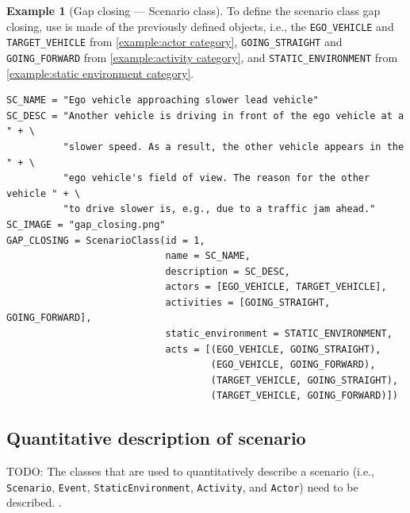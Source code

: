 \documentclass[10pt,final,a4paper,oneside,onecolumn]{article}
\theoremstyle{plain}\newtheorem{definition}{Definition}[section]    %
\theoremstyle{definition}\newtheorem{example}{Example}[section]     %
\theoremstyle{remark}\newtheorem{remarkenv}{Remark}[section]        %
\begin{document}
\begin{example}[Gap closing --- Scenario class]
	To define the scenario class gap closing, use is made of the previously defined objects, i.e., the \texttt{EGO\_VEHICLE} and \texttt{TARGET\_VEHICLE} from \cref{example:actor category}, \texttt{GOING\_STRAIGHT} and \texttt{GOING\_FORWARD} from \cref{example:activity category}, and \texttt{STATIC\_ENVIRONMENT} from \cref{example:static environment category}.
	
	\begin{lstlisting}[caption=Code for instantiating an object of \texttt{ScenarioClass}.]
SC_NAME = "Ego vehicle approaching slower lead vehicle"
SC_DESC = "Another vehicle is driving in front of the ego vehicle at a " + \
          "slower speed. As a result, the other vehicle appears in the " + \
          "ego vehicle's field of view. The reason for the other vehicle " + \
          "to drive slower is, e.g., due to a traffic jam ahead."
SC_IMAGE = "gap_closing.png"
GAP_CLOSING = ScenarioClass(id = 1,
                            name = SC_NAME,
                            description = SC_DESC,
                            actors = [EGO_VEHICLE, TARGET_VEHICLE],
                            activities = [GOING_STRAIGHT, GOING_FORWARD],
                            static_environment = STATIC_ENVIRONMENT,
                            acts = [(EGO_VEHICLE, GOING_STRAIGHT),
                                    (EGO_VEHICLE, GOING_FORWARD),
                                    (TARGET_VEHICLE, GOING_STRAIGHT),
                                    (TARGET_VEHICLE, GOING_FORWARD)])
	\end{lstlisting}
\end{example}

\subsection{Quantitative description of scenario}
\label{sec:quantitative scenario}

\color{red}
TODO: The classes that are used to quantitatively describe a scenario (i.e., \texttt{Scenario}, \texttt{Event}, \texttt{StaticEnvironment}, \texttt{Activity}, and \texttt{Actor}) need to be described.
\color{black}.

\cbend
\printbibliography
\end{document}

